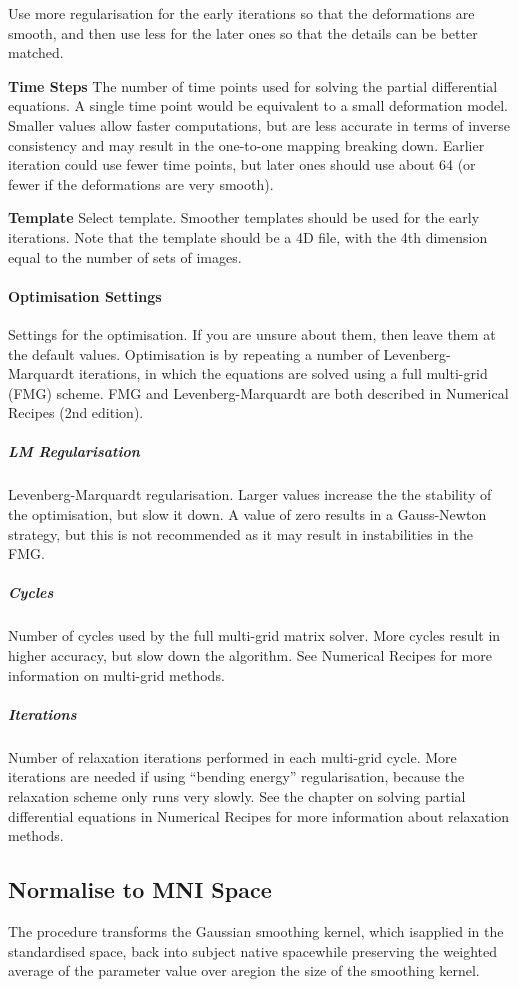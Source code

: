 Use more regularisation for the early iterations so that the deformations are smooth, and then use less for the later ones so that the details can be better matched.


\textbf{Time Steps}
The number of time points used for solving the partial differential equations.  A single time point would be equivalent to a small deformation model. Smaller values allow faster computations, but are less accurate in terms of inverse consistency and may result in the one-to-one mapping breaking down.  Earlier iteration could use fewer time points, but later ones should use about 64 (or fewer if the deformations are very smooth).


\textbf{Template}
Select template. Smoother templates should be used for the early iterations. Note that the template should be a 4D file, with the 4th dimension equal to the number of sets of images.


\paragraph{Optimisation Settings}
Settings for the optimisation.  If you are unsure about them, then leave them at the default values.  Optimisation is by repeating a number of Levenberg-Marquardt iterations, in which the equations are solved using a full multi-grid (FMG) scheme. FMG and Levenberg-Marquardt are both described in Numerical Recipes (2nd edition).


\subparagraph{LM Regularisation}
Levenberg-Marquardt regularisation.  Larger values increase the the stability of the optimisation, but slow it down.  A value of zero results in a Gauss-Newton strategy, but this is not recommended as it may result in instabilities in the FMG.


\subparagraph{Cycles}
Number of cycles used by the full multi-grid matrix solver. More cycles result in higher accuracy, but slow down the algorithm. See Numerical Recipes for more information on multi-grid methods.


\subparagraph{Iterations}
Number of relaxation iterations performed in each multi-grid cycle. More iterations are needed if using ``bending energy'' regularisation, because the relaxation scheme only runs very slowly. See the chapter on solving partial differential equations in Numerical Recipes for more information about relaxation methods.


\subsection{Normalise to MNI Space}
The procedure transforms the Gaussian smoothing kernel, which isapplied in the standardised space, back into subject native spacewhile preserving the weighted average of the parameter value over aregion the size of the smoothing kernel.


